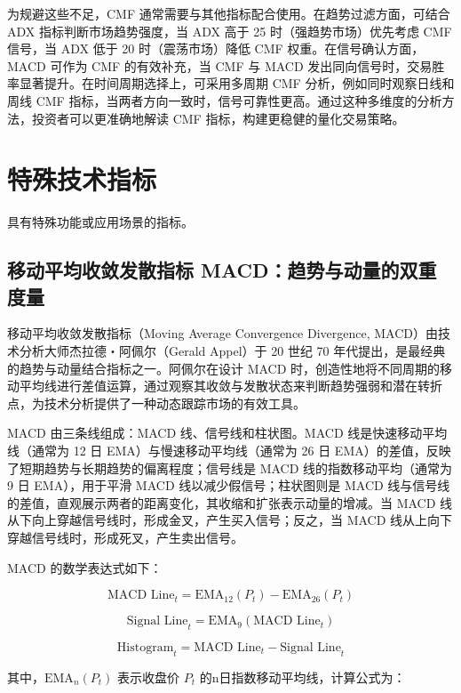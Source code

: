 \documentclass[]{ctexbook}
\begin{document}
为规避这些不足，CMF 通常需要与其他指标配合使用。在趋势过滤方面，可结合 ADX 指标判断市场趋势强度，当 ADX 高于 25 时（强趋势市场）优先考虑 CMF 信号，当 ADX 低于 20 时（震荡市场）降低 CMF 权重。在信号确认方面，MACD 可作为 CMF 的有效补充，当 CMF 与 MACD 发出同向信号时，交易胜率显著提升。在时间周期选择上，可采用多周期 CMF 分析，例如同时观察日线和周线 CMF 指标，当两者方向一致时，信号可靠性更高。通过这种多维度的分析方法，投资者可以更准确地解读 CMF 指标，构建更稳健的量化交易策略。

\section{特殊技术指标}\label{ux7279ux6b8aux6280ux672fux6307ux6807}

具有特殊功能或应用场景的指标。

\subsection{移动平均收敛发散指标 MACD：趋势与动量的双重度量}\label{ux79fbux52a8ux5e73ux5747ux6536ux655bux53d1ux6563ux6307ux6807-macdux8d8bux52bfux4e0eux52a8ux91cfux7684ux53ccux91cdux5ea6ux91cf}

移动平均收敛发散指标（Moving Average Convergence Divergence, MACD）由技术分析大师杰拉德・阿佩尔（Gerald Appel）于 20 世纪 70 年代提出，是最经典的趋势与动量结合指标之一。阿佩尔在设计 MACD 时，创造性地将不同周期的移动平均线进行差值运算，通过观察其收敛与发散状态来判断趋势强弱和潜在转折点，为技术分析提供了一种动态跟踪市场的有效工具。

MACD 由三条线组成：MACD 线、信号线和柱状图。MACD 线是快速移动平均线（通常为 12 日 EMA）与慢速移动平均线（通常为 26 日 EMA）的差值，反映了短期趋势与长期趋势的偏离程度；信号线是 MACD 线的指数移动平均（通常为 9 日 EMA），用于平滑 MACD 线以减少假信号；柱状图则是 MACD 线与信号线的差值，直观展示两者的距离变化，其收缩和扩张表示动量的增减。当 MACD 线从下向上穿越信号线时，形成金叉，产生买入信号；反之，当 MACD 线从上向下穿越信号线时，形成死叉，产生卖出信号。

MACD 的数学表达式如下：

\[\text{MACD Line}_t = \text{EMA}_{12}(P_t) - \text{EMA}_{26}(P_t)\]

\[\text{Signal Line}_t = \text{EMA}_9(\text{MACD Line}_t)\]

\[\text{Histogram}_t = \text{MACD Line}_t - \text{Signal Line}_t\]

其中，\(\text{EMA}_n(P_t)\) 表示收盘价 \(P_t\) 的n日指数移动平均线，计算公式为：
\end{document}
